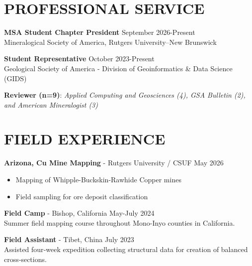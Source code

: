 \documentclass{res} %
\begin{document}
\begin{resume}
\begin{itemize}
\end{itemize}

\section{\Large{PROFESSIONAL SERVICE}}

\textbf{MSA Student Chapter President} \hfill September 2026-Present \\ Mineralogical Society of America, Rutgers University--New Brunswick

\textbf{Student Representative} \hfill October 2023-Present \\ Geological Society of America - Division of Geoinformatics \& Data Science (GIDS)

\textbf{Reviewer (n=9)}: \textit{Applied Computing and Geosciences (4), GSA Bulletin (2), and American Mineralogist (3)}

\section{\Large{FIELD EXPERIENCE}}

\textbf{Arizona, Cu Mine Mapping} - Rutgers University / CSUF \hfill May 2026
\begin{itemize}
    \item Mapping of Whipple-Buckskin-Rawhide Copper mines
    \item Field sampling for ore deposit classification
\end{itemize}

\textbf{Field Camp} - Bishop, California \hfill May-July 2024\\
Summer field mapping course throughout Mono-Inyo counties in California.

\textbf{Field Assistant} - Tibet, China \hfill July 2023\\
Assisted four‑week expedition collecting structural data for creation of balanced cross‑sections.


\end{resume}
\end{document}
